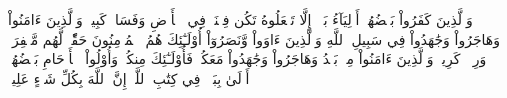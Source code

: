 وَٱلَّذِينَ كَفَرُواْ بَعۡضُهُمۡ أَوۡلِيَآءُ بَعۡضٍۚ إِلَّا تَفۡعَلُوهُ تَكُن فِتۡنَةٞ فِي ٱلۡأَرۡضِ وَفَسَادٞ كَبِيرٞ
وَٱلَّذِينَ ءَامَنُواْ وَهَاجَرُواْ وَجَٰهَدُواْ فِي سَبِيلِ ٱللَّهِ وَٱلَّذِينَ ءَاوَواْ وَّنَصَرُوٓاْ أُوْلَـٰٓئِكَ هُمُ ٱلۡمُؤۡمِنُونَ حَقّٗاۚ لَّهُم مَّغۡفِرَةٞ وَرِزۡقٞ كَرِيمٞ
وَٱلَّذِينَ ءَامَنُواْ مِنۢ بَعۡدُ وَهَاجَرُواْ وَجَٰهَدُواْ مَعَكُمۡ فَأُوْلَـٰٓئِكَ مِنكُمۡۚ وَأُوْلُواْ ٱلۡأَرۡحَامِ بَعۡضُهُمۡ أَوۡلَىٰ بِبَعۡضٖ فِي كِتَٰبِ ٱللَّهِۚ إِنَّ ٱللَّهَ بِكُلِّ شَيۡءٍ عَلِيمُۢ